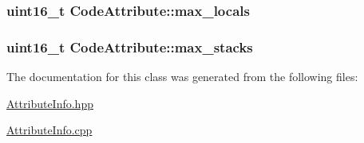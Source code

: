 \subsubsection[{\texorpdfstring{max\+\_\+locals}{max_locals}}]{\setlength{\rightskip}{0pt plus 5cm}uint16\+\_\+t Code\+Attribute\+::max\+\_\+locals}\hypertarget{class_code_attribute_a5e2d72942cf05feb8a512fcae6c3b2f3}{}\label{class_code_attribute_a5e2d72942cf05feb8a512fcae6c3b2f3}
\subsubsection[{\texorpdfstring{max\+\_\+stacks}{max_stacks}}]{\setlength{\rightskip}{0pt plus 5cm}uint16\+\_\+t Code\+Attribute\+::max\+\_\+stacks}\hypertarget{class_code_attribute_aa98def02b93e04d31b8e5c1cc12458f8}{}\label{class_code_attribute_aa98def02b93e04d31b8e5c1cc12458f8}


The documentation for this class was generated from the following files\+:\begin{DoxyCompactItemize}
\item 
\hyperlink{_attribute_info_8hpp}{Attribute\+Info.\+hpp}\item 
\hyperlink{_attribute_info_8cpp}{Attribute\+Info.\+cpp}\end{DoxyCompactItemize}
